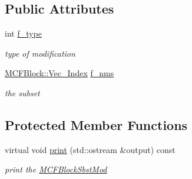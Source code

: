 \subsection*{Public Attributes}
\begin{DoxyCompactItemize}
\item 
\mbox{\label{class_s_m_spp__di__unipi__it_1_1_m_c_f_block_sbst_mod_a102e30a031044d9e821316a075e882b1}} 
int \mbox{\hyperlink{class_s_m_spp__di__unipi__it_1_1_m_c_f_block_sbst_mod_a102e30a031044d9e821316a075e882b1}{f\+\_\+type}}
\begin{DoxyCompactList}\small\item\em type of modification \end{DoxyCompactList}\item 
\mbox{\label{class_s_m_spp__di__unipi__it_1_1_m_c_f_block_sbst_mod_a08edef253aa57510f98eeb29af20889a}} 
\mbox{\hyperlink{class_s_m_spp__di__unipi__it_1_1_m_c_f_block_a9a1284953e2aa5222b5867c0a7f98499}{M\+C\+F\+Block\+::\+Vec\+\_\+\+Index}} \mbox{\hyperlink{class_s_m_spp__di__unipi__it_1_1_m_c_f_block_sbst_mod_a08edef253aa57510f98eeb29af20889a}{f\+\_\+nms}}
\begin{DoxyCompactList}\small\item\em the subset \end{DoxyCompactList}\end{DoxyCompactItemize}
\subsection*{Protected Member Functions}
\begin{DoxyCompactItemize}
\item 
\mbox{\label{class_s_m_spp__di__unipi__it_1_1_m_c_f_block_sbst_mod_a2e7b9c9148a98c5c342e8c25cac95926}} 
virtual void \mbox{\hyperlink{class_s_m_spp__di__unipi__it_1_1_m_c_f_block_sbst_mod_a2e7b9c9148a98c5c342e8c25cac95926}{print}} (std\+::ostream \&output) const
\begin{DoxyCompactList}\small\item\em print the \mbox{\hyperlink{class_s_m_spp__di__unipi__it_1_1_m_c_f_block_sbst_mod}{M\+C\+F\+Block\+Sbst\+Mod}} \end{DoxyCompactList}\end{DoxyCompactItemize}
